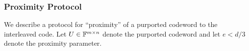 \subsubsection{Proximity Protocol}\label{sec:proximity2D}
We describe a protocol for ``proximity'' of a purported codeword to the interleaved code. Let $U\in \mathbb{F}^{m\times n}$ denote the purported codeword and let $e< d/3$ denote the proximity parameter. 
\begin{comment}
In its first message the prover computes commitments $c_1,\ldots,c_n$ to the columns of $U$ and sends it to verifier. Thereafter, the prover and the verifier interact as
follows:


\begin{enumerate}[{\rm 1.}]
\item $\prover\rightarrow \verifier$: Commitments $c_1,\ldots,c_n$ to the columns of $U$.
\item $\verifier\rightarrow \prover$: Verifier samples $\gamma \sample \bbF^n$ and sends to the prover.
\item $\prover\rightarrow \verifier$: The prover computes $u=\gamma^T U$ and sends it to the verifier. 
\item $\verifier\rightarrow \prover$: Verifier sends $t$ randomly sampled indexes $\{j_u\}_{u\in [t]}$ from $[n]$ to the prover.
\item $\prover\leftrightarrow\verifier$: The prover has to now prove to the verifier that $u_{j_u} = \gamma^T U[\cdot, j_u]$, for all $u \in [t]$. The prover and the verifier will run the inner-product argument to check $\innp{\gamma}{U[\cdot, j_u]} = w_{j_u}$ for all $u \in [t]$. The verifier proceeds if the checks succeed.
\item The verifier also checks if  $w\in L$ and accepts if it succeeds.
\end{enumerate}
.\pnote{conflict in notations: $u = \gamma^T U$ and $u \in [t]$}
---------------------------------------------------------------------------------------------------------------------------
\end{comment}
